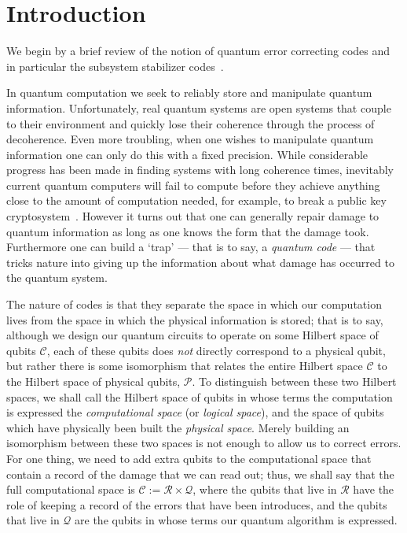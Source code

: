 \documentclass[twocolumn,showpacs,preprintnumbers,amsmath,amssymb,nofootinbib,pra,floatfix]{revtex4-1}
\begin{document}
\section{Introduction}

We begin by a brief review of the notion of quantum error correcting codes and in particular the subsystem stabilizer codes~\cite{Poulin:05a}.

In quantum computation we seek to reliably store and manipulate quantum information.  Unfortunately, real quantum systems are open systems that couple to their environment and quickly lose their coherence through the process of decoherence.  Even more troubling, when one wishes to manipulate quantum information one can only do this with a fixed precision.  While considerable progress has been made in finding systems with long coherence times, inevitably current quantum computers will fail to compute before they achieve anything close to the amount of computation needed, for example, to break a public key cryptosystem~\cite{Shor:94a}.  However it turns out that one can generally repair damage to quantum information as long as one knows the form that the damage took.  Furthermore one can build a `trap' --- that is to say, a
\emph{quantum code} --- that tricks nature into giving up the information about what damage has occurred to the quantum system.

The nature of codes is that they separate the space in which our computation lives from the space in which the physical information is
stored; that is to say, although we design our quantum circuits to operate on some Hilbert space of qubits $\mathscr{C}$, each of these qubits
does \emph{not} directly correspond to a physical qubit, but rather there is some isomorphism that relates the entire Hilbert space $\mathscr{C}$
to the Hilbert space of physical qubits, $\mathscr{P}$.  To distinguish between these two Hilbert spaces, we shall call the Hilbert space of qubits in whose terms the computation is expressed the \emph{computational space} (or \emph{logical space}), and the space of qubits which have physically been built the
\emph{physical space}.  Merely building an isomorphism between these two spaces is not enough to allow us to correct errors.  For one thing, we need to add extra qubits to the computational space that contain a record of the damage that we can read out; thus, we shall say that the full computational space is $\mathscr{C}:=\mathscr{R}\times\mathscr{Q}$, where the qubits that live in $\mathscr{R}$ have the role of keeping a
record of the errors that have been introduces, and the qubits that live in $\mathscr{Q}$ are the qubits in whose terms our quantum
algorithm is expressed.  
\end{document}
